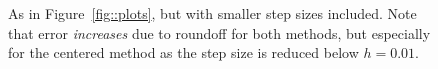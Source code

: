 \documentclass[12pt]{article}
\begin{document}
\begin{figure}[h!]
\begin{minipage}{0.48\textwidth}
\end{minipage}

\caption{As in Figure~\ref{fig::plots}, but with smaller step sizes included.  Note that error \textit{increases} due to roundoff for both methods, but especially for the centered method as the step size is reduced below \(h = 0.01\).}\label{fig::roundoff}
\end{figure}
%

%
\end{document}

